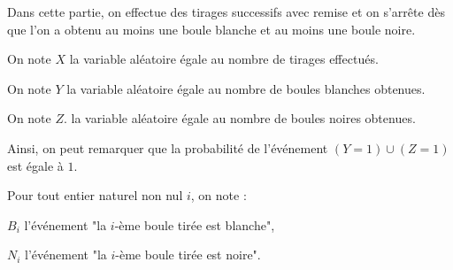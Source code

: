 \documentclass[11pt]{article}%
\begin{document}
Dans cette partie, on effectue des tirages successifs avec remise et on
s'arrête dès que l'on a obtenu au moins une boule blanche et au moins
une
boule noire.

On note $X$ la variable aléatoire égale au nombre de tirages effectués.

On note $Y$ la variable aléatoire égale au nombre de boules blanches
obtenues. 

On note $Z$. la variable aléatoire égale au nombre de boules noires
obtenues.

Ainsi, on peut remarquer que la probabilité de l'événement $\left( Y =
1\right) \cup \left( Z = 1\right) $ est égale à $1$. 

Pour tout entier naturel non nul $i$, on note :

\texttt{\hspace*{1cm}}$B_{i}$ l'événement "la $i$-ème boule tirée est
blanche", 

\texttt{\hspace*{1cm}}$N_{i}$ l'événement "la $i$-ème boule tirée est
noire".
\end{document}
